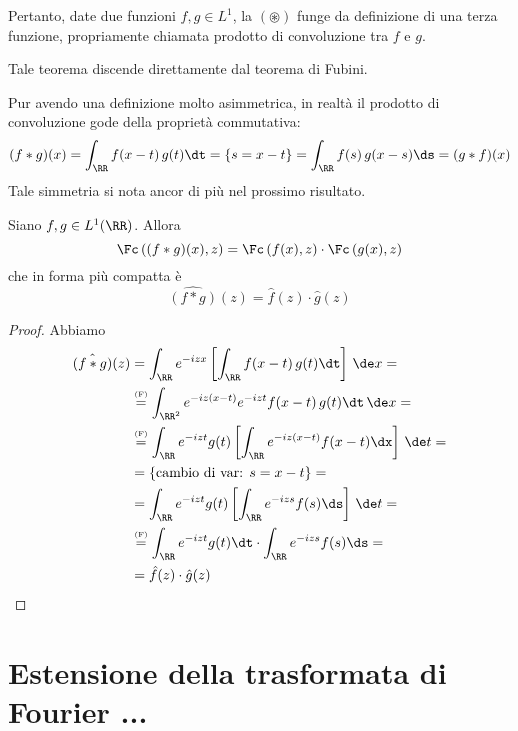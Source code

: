 Pertanto, date due funzioni $f,g\in L^1$, la $(\circledast)$ funge da definizione di una terza funzione, propriamente chiamata prodotto di convoluzione tra $f$ e $g$.

\begin{rem}
Tale teorema discende direttamente dal teorema di Fubini.
\end{rem}

\begin{rem}
Pur avendo una definizione molto asimmetrica, in realtà il prodotto di convoluzione gode della proprietà commutativa:
\begin{equation*}
(f*g)(x)=\int_\RR f(x-t)\,g(t)\dt=\left\{s=x-t\right\}=\int_\RR f(s)\,g(x-s)\ds=(g*f)(x)
\end{equation*}
Tale simmetria si nota ancor di più nel prossimo risultato.
\end{rem}

\begin{thm}
Siano $f,g\in L^1(\RR)$. Allora
\begin{equation*}
\Fc\left((f*g)(x),z\right)=\Fc\left(f(x),z\right)\cdot\Fc\left(g(x),z\right)
\end{equation*}
che in forma più compatta è
\begin{equation*}
\hat{(f*g)}(z)=\hat{f}(z)\cdot\hat{g}(z)
\end{equation*}
\end{thm}

\begin{proof}
Abbiamo
\begin{align*}
\hat{(f*g)}(z)&=\int_\RR e^{-izx}\left[\int_\RR f(x-t)\,g(t)\dt\right]\,\de x=\\
&\overset{\underset{\mathrm{(F)}}{}}{=}\int_{\RR^2}e^{-iz(x-t)}e^{-izt}f(x-t)\,g(t)\dt\,\de x =\\
&\overset{\underset{\mathrm{(F)}}{}}{=}\int_{\RR} e^{-izt}g(t)\left[\int_\RR e^{-iz(x-t)} f(x-t)\dx\right]\,\de t=\\
&=\left\{\text{cambio di var: }s=x-t\right\}=\\
&=\int_{\RR} e^{-izt}g(t)\left[\int_\RR e^{-izs} f(s)\ds\right]\,\de t=\\
&\overset{\underset{\mathrm{(F)}}{}}{=}\int_\RR e^{-izt}g(t)\dt\cdot \int_\RR e^{-izs} f(s)\ds =\\
&= \hat{f}(z)\cdot\hat{g}(z)
\end{align*}
\end{proof}


\section{Estensione della trasformata di Fourier ... }


